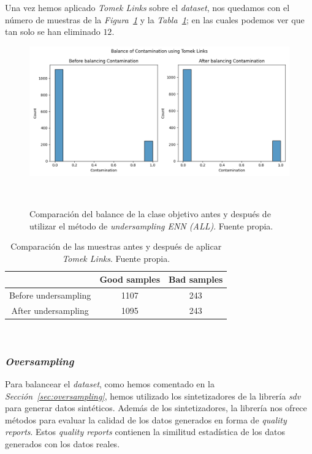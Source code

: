 Una vez hemos aplicado \textit{Tomek Links} sobre el \textit{dataset}, nos quedamos con el número de muestras de la \textit{Figura\ \ref{fig:balance-tl}} y la \textit{Tabla\ \ref{tab:balance-tl-comparison}}; en las cuales podemos ver que tan solo se han eliminado $12$.

\begin{figure}[!ht]
    \centering
    \includegraphics[width=0.8\linewidth]{media/images/balance.png}
    \caption{Comparación del balance de la clase objetivo antes y después de utilizar el método de \textit{undersampling ENN (ALL)}. Fuente propia.}\ \label{fig:balance-tl}
\end{figure}

\begin{table}
    \centering
    \begin{tabular}{|c|cc|} \hline
        & Good samples & Bad samples \\ \hline
        Before undersampling & 1107 & 243 \\
        After undersampling & 1095 & 243 \\ \hline
    \end{tabular}
    \caption{Comparación de las muestras antes y después de aplicar \textit{Tomek Links}. Fuente propia.}\ \label{tab:balance-tl-comparison}
\end{table}

\subsubsection{\textit{Oversampling}}

Para balancear el \textit{dataset}, como hemos comentado en la \textit{Sección\ \ref{sec:oversampling}}, hemos utilizado los sintetizadores de la librería \textit{sdv} para generar datos sintéticos. Además de los sintetizadores, la librería nos ofrece métodos para evaluar la calidad de los datos generados en forma de \textit{quality reports}. Estos \textit{quality reports} contienen la similitud estadística de los datos generados con los datos reales.

